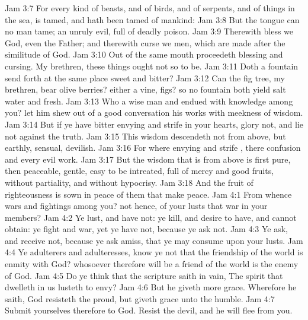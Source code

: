 \vs Jam 3:7 For every kind of beasts, and of birds, and of serpents, and of things in the sea, is tamed, and hath been tamed of mankind:
\vs Jam 3:8 But the tongue can no man tame;  an unruly evil, full of deadly poison.
\vs Jam 3:9 Therewith bless we God, even the Father; and therewith curse we men, which are made after the similitude of God.
\vs Jam 3:10 Out of the same mouth proceedeth blessing and cursing. My brethren, these things ought not so to be.
\vs Jam 3:11 Doth a fountain send forth at the same place sweet  and bitter?
\vs Jam 3:12 Can the fig tree, my brethren, bear olive berries? either a vine, figs? so  no fountain both yield salt water and fresh.
\vs Jam 3:13 Who  a wise man and endued with knowledge among you? let him shew out of a good conversation his works with meekness of wisdom.
\vs Jam 3:14 But if ye have bitter envying and strife in your hearts, glory not, and lie not against the truth.
\vs Jam 3:15 This wisdom descendeth not from above, but  earthly, sensual, devilish.
\vs Jam 3:16 For where envying and strife , there  confusion and every evil work.
\vs Jam 3:17 But the wisdom that is from above is first pure, then peaceable, gentle,  easy to be intreated, full of mercy and good fruits, without partiality, and without hypocrisy.
\vs Jam 3:18 And the fruit of righteousness is sown in peace of them that make peace.
\vs Jam 4:1 From whence  wars and fightings among you?  not hence,  of your lusts that war in your members?
\vs Jam 4:2 Ye lust, and have not: ye kill, and desire to have, and cannot obtain: ye fight and war, yet ye have not, because ye ask not.
\vs Jam 4:3 Ye ask, and receive not, because ye ask amiss, that ye may consume  upon your lusts.
\vs Jam 4:4 Ye adulterers and adulteresses, know ye not that the friendship of the world is enmity with God? whosoever therefore will be a friend of the world is the enemy of God.
\vs Jam 4:5 Do ye think that the scripture saith in vain, The spirit that dwelleth in us lusteth to envy?
\vs Jam 4:6 But he giveth more grace. Wherefore he saith, God resisteth the proud, but giveth grace unto the humble.
\vs Jam 4:7 Submit yourselves therefore to God. Resist the devil, and he will flee from you.
